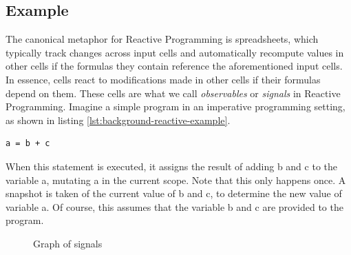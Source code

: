 \subsection{Example}

The canonical metaphor for Reactive Programming is spreadsheets, which typically track changes across input cells and automatically recompute values in other cells if the formulas they contain reference the aforementioned input cells. In essence, cells react to modifications made in other cells if their formulas depend on them. These cells are what we call \textit{observables} or \textit{signals} in Reactive Programming.
Imagine a simple program in an imperative programming setting, as shown in listing \ref{lst:background-reactive-example}.

\begin{lstlisting}[caption={A basic reactive program},captionpos=b,label={lst:background-reactive-example}]
	a = b + c
\end{lstlisting}

When this statement is executed, it assigns the result of adding b and c to the variable a, mutating a in the current scope. Note that this only happens once. A snapshot is taken of the current value of b and c, to determine the new value of variable a. Of course, this assumes that the variable b and c are provided to the program.

\begin{figure}[h]
	\caption{Graph of signals}
	\label{fig:background-reactive-example}
\end{figure}

